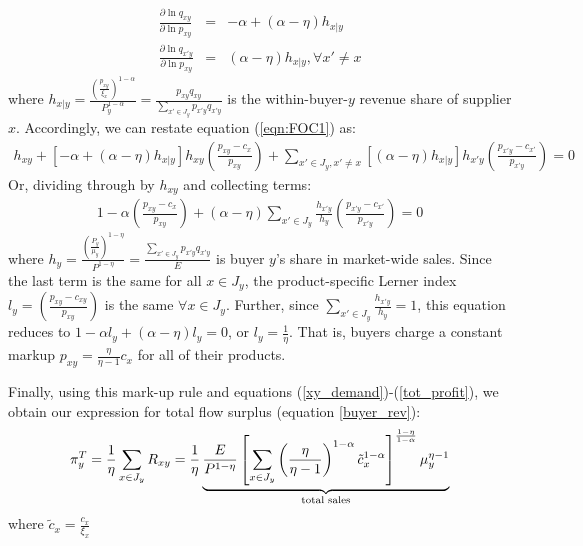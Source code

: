 \documentclass[12pt]{article} \usepackage{amsmath,amssymb,amsthm,geometry,graphicx,setspace,algorithm,algpseudocode,float}
\begin{document}
\begin{eqnarray}
\frac{\partial \ln q_{xy}}{\partial \ln p_{xy}} &=& -\alpha + (\alpha-\eta) h_{x|y}
\label{eqn:own_elas}\\
\frac{\partial \ln q_{x'y}}{\partial \ln p_{xy}} &=& (\alpha-\eta) h_{x|y}, \forall x'\neq x 
\label{eqn:cross_elas}
\end{eqnarray}
where $h_{x|y}=\frac{\left( \frac{
p_{xy}}{\xi _{x}}\right) ^{1-\alpha }}{P_{y}^{1-\alpha }} = \frac{p_{xy}q_{xy}}{\sum_{x' \in J_y} p_{x'y}q_{x'y}}$ is the within-buyer-$y$ revenue share of supplier $x$. Accordingly, we can restate equation (\ref{eqn:FOC1}) as: 
\begin{align*}
  h_{xy} + [-\alpha+(\alpha-\eta)h_{x|y}]h_{xy}\left(\frac{p_{xy}-c_{x}}{p_{xy}}  \right) + \sum_{x'\in J_y, x'\neq x} [(\alpha-\eta)h_{x|y}] h_{x'y}\left(\frac{p_{x'y}-c_{x'}}{p_{x'y}} \right) = 0
\end{align*}
Or, dividing through by $h_{xy}$ and collecting terms:
\begin{align*}
  1 - \alpha \left(\frac{p_{xy}-c_{x}}{p_{xy}} \right) + (\alpha-\eta) \sum_{x'\in J_y} \frac{h_{x'y}}{h_y} \left(\frac{p_{x'y}-c_{x'}}{p_{x'y}} \right) = 0
\end{align*}
where $h_{y}= \frac{\left( 
\frac{P_{y}}{\mu_y} \right)^{1-\eta}}{P^{1-\eta }} = \frac{\sum_{x' \in J_y} p_{x'y}q_{x'y}}{E}$ is buyer $y$'s share in market-wide sales. Since the last term is the same for all $x\in J_y$,  the product-specific Lerner index $l_y = \left(\frac{p_{xy} - c_{xy}}{p_{xy}}\right)$ is the same $\forall x\in J_y$. Further, since $\sum_{x' \in J_y} \frac{h_{x'y}}{h_y}=1$, this equation reduces to $1 - \alpha l_y + (\alpha-\eta) l_y = 0$, or $l_y = \frac{1}{\eta}$. That is, buyers charge a constant markup $p_{xy} = \frac{\eta}{\eta-1} c_{x}$ for all of their products. 

Finally, using this mark-up rule and equations (\ref{xy_demand})-(\ref{tot_profit}), we obtain our expression for total flow surplus (equation \ref{buyer_rev}):
\begin{align*}
\pi_{y}^{T}=\frac{1}{\eta}\sum_{x\in J_{y}}R_{xy}=\frac{1}{\eta}\underbrace{\frac{E}{P^{1-\eta }}\left[ \sum_{x\in J_{y}}\left( \frac{
\eta }{\eta -1}\right) ^{1-\alpha }\tilde{c}_{x}^{1-\alpha }\right] ^{\frac{%
1-\eta }{1-\alpha }}\mu _{y}^{\eta -1}}_{\text{total sales}}
\end{align*}
where $\tilde{c}_{x} = \frac{c_{x}}{\xi_x}$
\end{document}
